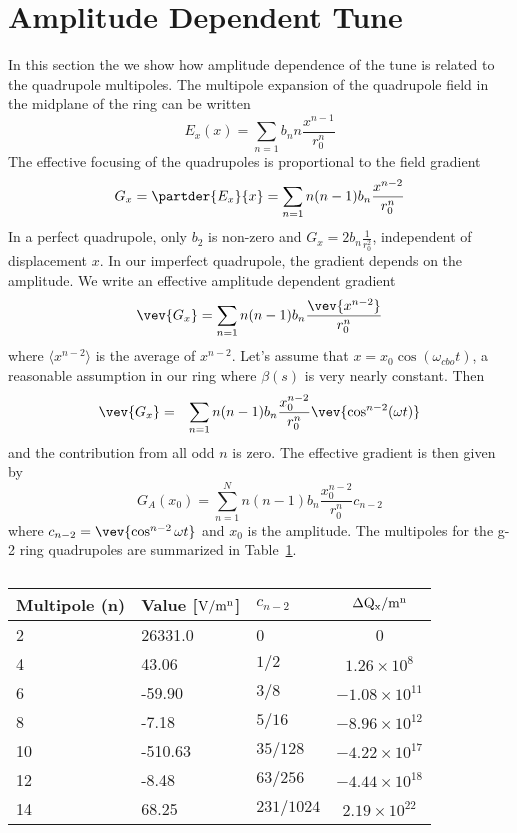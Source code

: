 \documentclass[10pt]{article}
\begin{document}
\section{Amplitude Dependent Tune}
In this section the we show how amplitude dependence of the tune is related to the quadrupole multipoles.
The multipole expansion of the quadrupole field in the midplane of the ring can be written\cite{NIMesquad}
$$E_x(x) = \sum_{n=1} b_n n\frac{x^{n-1}}{r_0^n}$$
The effective focusing of the quadrupoles is proportional to the field gradient
$$G_x = \partder{E_x}{x}=\sum_{n=1} n(n-1) b_n \frac{x^{n-2}}{r_0^n}$$
In a perfect quadrupole, only $b_2$ is non-zero and $G_x = 2b_n\frac{1}{r_0^2}$, independent of displacement $x$. 
In our imperfect quadrupole,
the gradient depends on the amplitude. We write an effective amplitude dependent gradient 
$$\vev{G_x} = \sum_{n=1} n(n-1) b_n \frac{\vev{x^{n-2}}}{r_0^n}$$
where $\langle x^{n-2}\rangle$ is the average of $x^{n-2}$.
Let's assume that $x =x_0\cos(\omega_{cbo} t)$, a reasonable assumption in our ring where $\beta(s)$ is very nearly constant. Then     
\begin{eqnarray}
\vev{G_x} &=& \sum_{n=1} n(n-1) b_n \frac{x_0^{n-2}}{r_0^n}\vev{\cos^{n-2}(\omega t)}\label{gradient}\\
\end{eqnarray}
and the contribution from all odd $n$ is zero.
The effective gradient is then given by
$${G_A(x_0)} = \sum_{n=1}^N n(n-1) b_{n} \frac{x_0^{n-2}}{r_0^{n}}c_{n-2}$$
where $c_{n-2} = \vev{\cos^{n-2}\omega t}$ and $x_0$ is the amplitude.
The multipoles for the g-2 ring quadrupoles are summarized in Table~\ref{quadparams}.
\begin{table}[b]
\caption{}
\begin{center}
\begin{tabular}{|l|l|l|c|}
\hline
Multipole (n) & Value [${\rm V/m^n}$]&$c_{n-2}$& $\Delta {\rm Q_x/m^n}$\\ \hline
2&26331.0 &0& 0 \\
4&43.06 & $1/2$&$1.26\times 10^{8}$\\
6& -59.90&${3}/{8}$&$-1.08\times 10^{11}$\\
8& -7.18&${5}/{16}$&$-8.96\times 10^{12}$\\
10& -510.63&${35}/{128}$&$-4.22\times 10^{17}$\\
12& -8.48&${63}/{256}$&$-4.44\times 10^{18}$\\
14& 68.25&$231/1024$&$2.19\times 10^{22}$\\
\hline
\end{tabular}
\end{center}
\label{quadparams}
\end{table}
\end{document}
